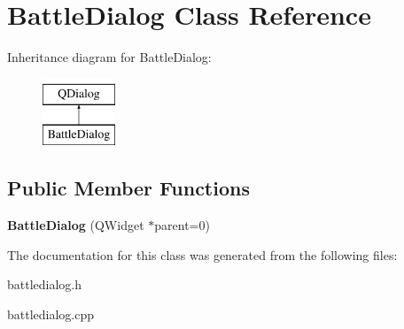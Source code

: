\hypertarget{class_battle_dialog}{}\section{Battle\+Dialog Class Reference}
\label{class_battle_dialog}
Inheritance diagram for Battle\+Dialog\+:\begin{figure}[H]
\begin{center}
\leavevmode
\includegraphics[height=2.000000cm]{class_battle_dialog}
\end{center}
\end{figure}
\subsection*{Public Member Functions}
\begin{DoxyCompactItemize}
\item 
\mbox{\label{class_battle_dialog_af613b3d81895f3907122da94a3033b94}} 
{\bfseries Battle\+Dialog} (Q\+Widget $\ast$parent=0)
\end{DoxyCompactItemize}


The documentation for this class was generated from the following files\+:\begin{DoxyCompactItemize}
\item 
battledialog.\+h\item 
battledialog.\+cpp\end{DoxyCompactItemize}
